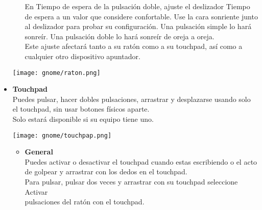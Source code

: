 \documentclass[12pt,letterpaper]{book}
\begin{document}
\begin{itemize}
\begin{itemize}
En Tiempo de espera de la pulsación doble, ajuste el deslizador Tiempo de espera a un valor que considere confortable. Use la cara sonriente junto al deslizador para probar su configuración. Una pulsación simple lo hará sonreír. Una pulsación doble lo hará sonreír de oreja a oreja.\\

Este ajuste afectará tanto a su ratón como a su touchpad, así como a cualquier otro dispositivo apuntador.
\end{itemize}
\begin{center}
\texttt{[image: gnome/raton.png]} 
\end{center}
\item{\large \bf Touchpad}\\
Puedes pulsar, hacer dobles pulsaciones, arrastrar y desplazarse usando solo el touchpad, sin usar botones físicos aparte.\\
Solo estará disponible si su equipo tiene uno.
	\begin{center}
\texttt{[image: gnome/touchpap.png]}
\end{center} 
	\begin{itemize}
\item{\bf General}\\
Puedes activar o desactivar el touchpad cuando estas escribiendo o el acto de golpear y arrastrar con los dedos en el touchpad.\\ 

Para pulsar, pulsar dos veces y arrastrar con su touchpad seleccione Activar\\ pulsaciones del ratón con el touchpad.\\


\end{itemize}
\end{itemize}
\end{document}
